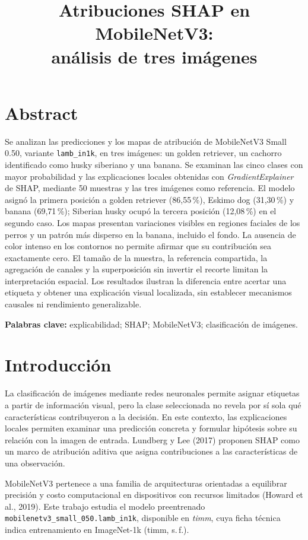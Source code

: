 \documentclass[10pt,a4paper,twocolumn]{article}
\title{Atribuciones SHAP en MobileNetV3:\\análisis de tres imágenes}
\author{}
\date{}
\newcommand{\pc}[1]{#1\,\%}
\begin{document}
\maketitle
\section*{Abstract}
Se analizan las predicciones y los mapas de atribución de MobileNetV3 Small 0.50, variante \texttt{lamb\_in1k}, en tres imágenes: un golden retriever, un cachorro identificado como husky siberiano y una banana. Se examinan las cinco clases con mayor probabilidad y las explicaciones locales obtenidas con \textit{GradientExplainer} de SHAP, mediante 50 muestras y las tres imágenes como referencia. El modelo asignó la primera posición a golden retriever (\pc{86,55}), Eskimo dog (\pc{31,30}) y banana (\pc{69,71}); Siberian husky ocupó la tercera posición (\pc{12,08}) en el segundo caso. Los mapas presentan variaciones visibles en regiones faciales de los perros y un patrón más disperso en la banana, incluido el fondo. La ausencia de color intenso en los contornos no permite afirmar que su contribución sea exactamente cero. El tamaño de la muestra, la referencia compartida, la agregación de canales y la superposición sin invertir el recorte limitan la interpretación espacial. Los resultados ilustran la diferencia entre acertar una etiqueta y obtener una explicación visual localizada, sin establecer mecanismos causales ni rendimiento generalizable.

\noindent\textbf{Palabras clave:} explicabilidad; SHAP; MobileNetV3; clasificación de imágenes.

\section{Introducción}
La clasificación de imágenes mediante redes neuronales permite asignar etiquetas a partir de información visual, pero la clase seleccionada no revela por sí sola qué características contribuyeron a la decisión. En este contexto, las explicaciones locales permiten examinar una predicción concreta y formular hipótesis sobre su relación con la imagen de entrada. Lundberg y Lee (2017) proponen SHAP como un marco de atribución aditiva que asigna contribuciones a las características de una observación.

MobileNetV3 pertenece a una familia de arquitecturas orientadas a equilibrar precisión y costo computacional en dispositivos con recursos limitados (Howard et al., 2019). Este trabajo estudia el modelo preentrenado \texttt{mobilenetv3\_small\_050.lamb\_in1k}, disponible en \textit{timm}, cuya ficha técnica indica entrenamiento en ImageNet-1k (timm, s.\,f.).
\end{document}
